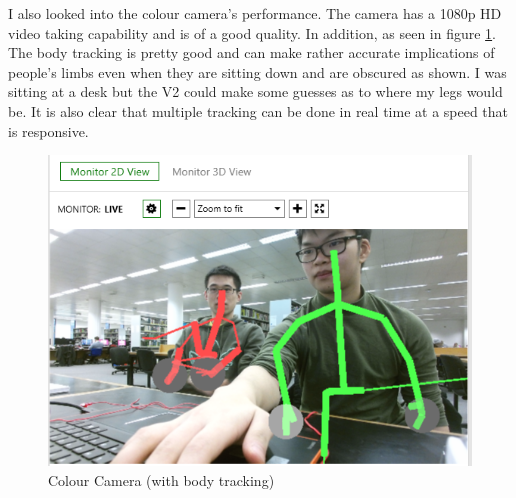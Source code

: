 \documentclass[11pt]{report}
\begin{document}
I also looked into the colour camera's performance. The camera has a 1080p HD
video taking capability and is of a good quality. In addition, as seen in 
figure \ref{KinectColour}. The body tracking is pretty good and can make rather
accurate implications of people's limbs even when they are sitting down and are
obscured as shown. I was sitting at a desk but the V2 could make some guesses
as to where my legs would be. It is also clear that multiple tracking can be done
in real time at a speed that is responsive.
\begin{center}
	\begin{figure}[H]
		\begin{center}
			\includegraphics[scale=0.5]{pics/KinectColor}
				\caption{Colour Camera (with body tracking)}
				\label{KinectColour}
		\end{center}
	\end{figure}
\end{center}
\end{document}
